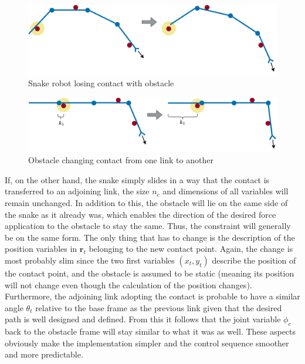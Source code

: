 \begin{figure}[h!]
    \centering
    \includegraphics[width=\textwidth]{figures/theory/obst_slide_sequence1.pdf}
    \caption{Snake robot losing contact with obstacle}
    \label{fig:obst_slide_seq1}
\end{figure}

\begin{figure}[h!]
    \centering
    \includegraphics[width=\textwidth]{figures/theory/obst_slide_sequence2.pdf}
    \caption{Obstacle changing contact from one link to another}
    \label{fig:obst_slide_seq2}
\end{figure}

If, on the other hand, the snake simply slides in a way that the contact is transferred to an adjoining link, the size $n_c$ and dimensions of all variables will remain unchanged. In addition to this, the obstacle will lie on the same side of the snake as it already was, which enables the direction of the desired force application to the obstacle to stay the same. Thus, the constraint will generally be on the same form. The only thing that has to change is the description of the position variables in $\mathbf{r}_t$ belonging to the new contact point. Again, the change is most probably slim since the two first variables $(x_t, y_t)$ describe the position of the contact point, and the obstacle is assumed to be static (meaning its position will not change even though the calculation of the position changes). Furthermore, the adjoining link adopting the contact is probable to have a similar angle $\theta_t$ relative to the base frame as the previous link given that the desired path is well designed and defined. From this it follows that the joint variable $\phi_c$ back to the obstacle frame will stay similar to what it was as well. These aspects obviously make the implementation simpler and the control sequence smoother and more predictable.


